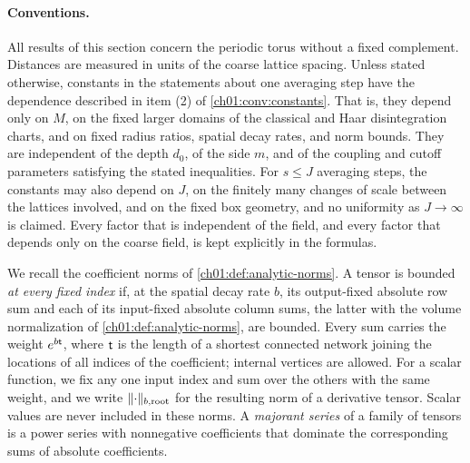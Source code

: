 \paragraph{Conventions.}
All results of this section concern the periodic torus without a fixed complement. Distances are measured in units of the coarse lattice spacing. Unless stated otherwise, constants in the statements about one averaging step have the dependence described in item (2) of \cref{ch01:conv:constants}. That is, they depend only on $M$, on the fixed larger domains of the classical and Haar disintegration charts, and on fixed radius ratios, spatial decay rates, and norm bounds. They are independent of the depth $d_0$, of the side $m$, and of the coupling and cutoff parameters satisfying the stated inequalities. For $s\le J$ averaging steps, the constants may also depend on $J$, on the finitely many changes of scale between the lattices involved, and on the fixed box geometry, and no uniformity as $J\to\infty$ is claimed. Every factor that is independent of the field, and every factor that depends only on the coarse field, is kept explicitly in the formulas.

We recall the coefficient norms of \cref{ch01:def:analytic-norms}. A tensor is bounded \emph{at every fixed index} if, at the spatial decay rate $b$, its output-fixed absolute row sum and each of its input-fixed absolute column sums, the latter with the volume normalization of \cref{ch01:def:analytic-norms}, are bounded. Every sum carries the weight $e^{b\mathsf t}$, where $\mathsf t$ is the length of a shortest connected network joining the locations of all indices of the coefficient; internal vertices are allowed. For a scalar function, we fix any one input index and sum over the others with the same weight, and we write $\lVert \cdot\rVert_{b,\mathrm{root}}$ for the resulting norm of a derivative tensor. Scalar values are never included in these norms. A \emph{majorant series} of a family of tensors is a power series with nonnegative coefficients that dominate the corresponding sums of absolute coefficients.

